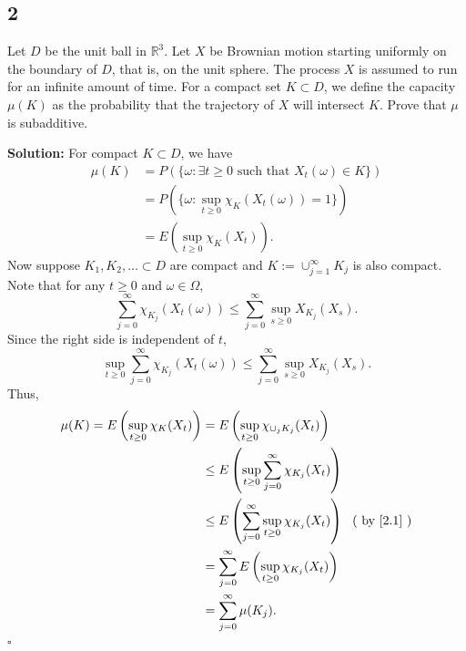 \documentclass[12pt]{article}
\newcounter{ProofCounter}
\newenvironment{Solution}{\stepcounter{ProofCounter}\textbf{Solution:}}{\hfill$\square$}
\begin{document}

\subsection*{2}
\begin{tcolorbox}
  Let $D$ be the unit ball in $\mathbb{R}^3$. Let $X$ be Brownian motion starting uniformly on the boundary of $D$, that is, on the unit sphere. The process $X$ is assumed to run for an infinite amount of time. For a compact set $K \subset D$, we define the capacity $\mu(K)$ as the probability that the trajectory of $X$ will intersect $K$. Prove that $\mu$ is subadditive.
\end{tcolorbox}
\begin{Solution}
  For compact $K \subset D$, we have
  \begin{align*}
    \mu(K) & = P(\{ \omega : \exists t \geq 0 \text{ such that } X_t(\omega) \in K \}) \\
    & = P(\{ \omega : \sup_{t\geq 0} \chi_{K}(X_t(\omega)) = 1 \}) \\
    & = E\left( \sup_{t \geq 0} \chi_K(X_t) \right).
  \end{align*}
  Now suppose $K_1, K_2, \dots \subset D$ are compact and $K := \cup_{j=1}^{\infty} K_j$ is also compact. Note that for any $t \geq 0$ and $\omega \in \Omega$,
  \[
    \sum_{j=0}^{\infty} \chi_{K_j} (X_t(\omega)) \leq \sum_{j=0}^{\infty} \sup_{s \geq 0} X_{K_j}(X_s).
  \]
  Since the right side is independent of $t$,
  \begin{equation}
    \sup_{t\geq 0}\sum_{j=0}^{\infty} \chi_{K_j} (X_t(\omega)) \leq \sum_{j=0}^{\infty} \sup_{s \geq 0} X_{K_j}(X_s).
    \label{2.1}
  \end{equation}
  Thus,
  \begin{align*}
    \mu(K) = E\left( \sup_{t \geq 0} \chi_K(X_t) \right) & = E \left( \sup_{t\geq 0} \chi_{\cup_j K_j}(X_t) \right) \\
    & \leq E \left( \sup_{t \geq 0} \sum_{j=0}^{\infty} \chi_{K_j}(X_t) \right) \\
    & \leq E \left( \sum_{j=0}^{\infty} \sup_{t\geq 0} \chi_{K_j}(X_t) \right) \ \ \text{( by \eqref{2.1} )} \\
    & = \sum_{j=0}^{\infty} E \left( \sup_{t\geq 0} \chi_{K_j}(X_t) \right) \\
    & = \sum_{j=0}^{\infty} \mu(K_j).
    \end{align*}
\end{Solution}
\end{document}
